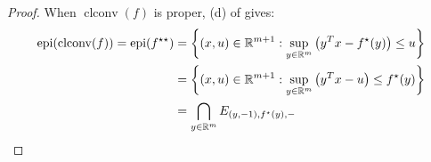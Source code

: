 \begin{proof}
	When $\operatorname{clconv}(f)$ is proper, (d) of  gives:
	\begin{align*}
		\operatorname{epi}(\operatorname{clconv}(f)) =\operatorname{epi}(f^{\star\star}) & =\left\{
		(x,u)\in \mathbb{R}^{m+1}:\sup_{y\in \mathbb{R}^m} \left(y^Tx-f^\star(y)\right)\leq u
		\right\}                                                                                                                                         \\
		                                                                                 & =\left\{
		(x,u)\in \mathbb{R}^{m+1}:\sup_{y\in \mathbb{R}^m} \left(y^Tx-u\right)\leq f^\star(y)
		\right\}                                                                                                                                         \\
		                                                                                 & =\bigcap_{y\in \mathbb{R}^m}E_{(y,-1),f^\star(y),-}\qedhere{}
	\end{align*}
\end{proof}
